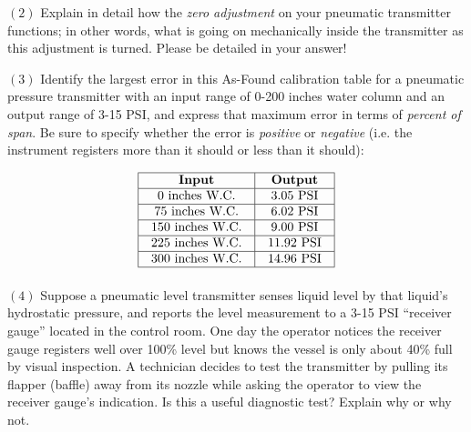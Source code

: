 \vskip 20pt

\item{$(2)$} Explain in detail how the {\it zero adjustment} on your pneumatic transmitter functions; in other words, what is going on mechanically inside the transmitter as this adjustment is turned.  Please be detailed in your answer!

\vskip 20pt

\item{$(3)$} Identify the largest error in this As-Found calibration table for a pneumatic pressure transmitter with an input range of 0-200 inches water column and an output range of 3-15 PSI, and express that maximum error in terms of {\it percent of span}.  Be sure to specify whether the error is {\it positive} or {\it negative} (i.e. the instrument registers more than it should or less than it should):


$$\vbox{\offinterlineskip
\halign{\strut
\vrule \quad\hfil # \ \hfil & 
\vrule \quad\hfil # \ \hfil \vrule \cr
\noalign{\hrule}
%
{\bf Input} & {\bf Output} \cr
%
\noalign{\hrule}
%
0 inches W.C. & 3.05 PSI \cr
%
\noalign{\hrule}
%
75 inches W.C. & 6.02 PSI \cr
%
\noalign{\hrule}
%
150 inches W.C. & 9.00 PSI \cr
%
\noalign{\hrule}
%
225 inches W.C. & 11.92 PSI \cr
%
\noalign{\hrule}
%
300 inches W.C. & 14.96 PSI \cr
%
\noalign{\hrule}
} %
}$$ %

\vskip 20pt

\item{$(4)$} Suppose a pneumatic level transmitter senses liquid level by that liquid's hydrostatic pressure, and reports the level measurement to a 3-15 PSI ``receiver gauge'' located in the control room.  One day the operator notices the receiver gauge registers well over 100\% level but knows the vessel is only about 40\% full by visual inspection.  A technician decides to test the transmitter by pulling its flapper (baffle) away from its nozzle while asking the operator to view the receiver gauge's indication.  Is this a useful diagnostic test?  Explain why or why not.


















